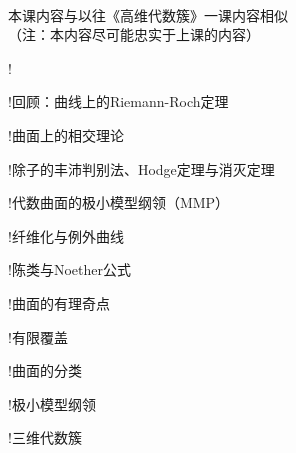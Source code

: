 \begin{center}
     \\
     本课内容与以往《高维代数簇》一课内容相似
    \\ （注：本内容尽可能忠实于上课的内容）

\end{center}

\begin{structure}
    \subpage!{}
    

    \subpage!{回顾：曲线上的Riemann-Roch定理}

    \subpage!{曲面上的相交理论}

    \subpage!{除子的丰沛判别法、Hodge定理与消灭定理}

    \subpage!{代数曲面的极小模型纲领（MMP）}

    \subpage!{纤维化与例外曲线}

    \subpage!{陈类与Noether公式}

    \subpage!{曲面的有理奇点}

    \subpage!{有限覆盖}

    \subpage!{曲面的分类}


    \subpage!{极小模型纲领}

    \subpage!{三维代数簇}

\end{structure}